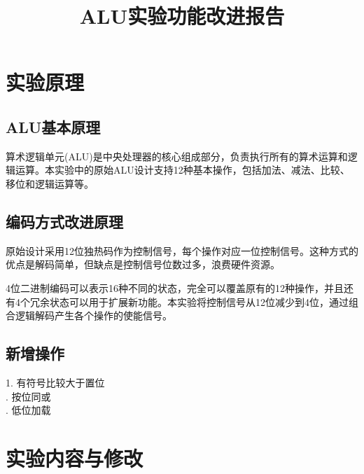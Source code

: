 \documentclass[12pt,a4paper]{article}
\title{ALU实验功能改进报告}
\date{}
\begin{document}
\maketitle



\section{实验原理}
\subsection{ALU基本原理}
算术逻辑单元(ALU)是中央处理器的核心组成部分，负责执行所有的算术运算和逻辑运算。本实验中的原始ALU设计支持12种基本操作，包括加法、减法、比较、移位和逻辑运算等。

\subsection{编码方式改进原理}
原始设计采用12位独热码作为控制信号，每个操作对应一位控制信号。这种方式的优点是解码简单，但缺点是控制信号位数过多，浪费硬件资源。

4位二进制编码可以表示16种不同的状态，完全可以覆盖原有的12种操作，并且还有4个冗余状态可以用于扩展新功能。本实验将控制信号从12位减少到4位，通过组合逻辑解码产生各个操作的使能信号。

\subsection{新增操作}
1. 有符号比较大于置位 \\
. 按位同或 \\
. 低位加载


\section{实验内容与修改}
\end{document}
